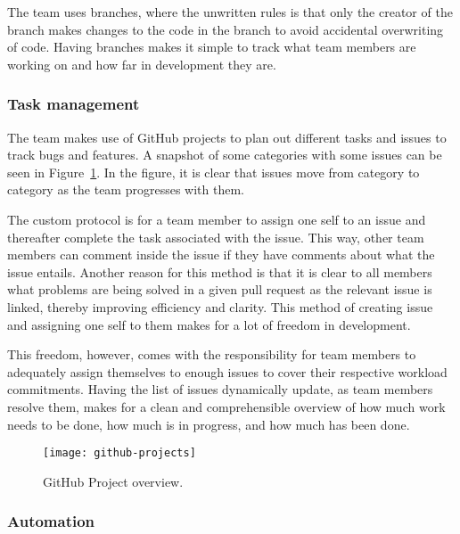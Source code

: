 The team uses branches, where the unwritten rules is that only the creator of the branch makes changes to the code in
the branch to avoid accidental overwriting of code.
Having branches makes it simple to track what team members are working on and how far in development they are.

\subsubsection{Task management}

The team makes use of GitHub projects to plan out different tasks and issues to track bugs and features.
A snapshot of some categories with some issues can be seen in Figure~\ref{fig:github-project}.
In the figure, it is clear that issues move from category to category as the team progresses with them.

The custom protocol is for a team member to assign one self to an issue and thereafter complete the task associated with
the issue.
This way, other team members can comment inside the issue if they have comments about what the issue entails.
Another reason for this method is that it is clear to all members what problems are being solved in a given pull request
as the relevant issue is linked, thereby improving efficiency and clarity.
This method of creating issue and assigning one self to them makes for a lot of freedom in development.

This freedom, however, comes with the responsibility for team members to adequately assign themselves to enough issues
to cover their respective workload commitments.
Having the list of issues dynamically update, as team members resolve them, makes for a clean and
comprehensible overview of how much work needs to be done, how much is in progress, and how much has been done.

\begin{figure}[htb]
    \centering
    \texttt{[image: github-projects]}
    \caption{GitHub Project overview.}\label{fig:github-project}
\end{figure}


\subsubsection{Automation}

